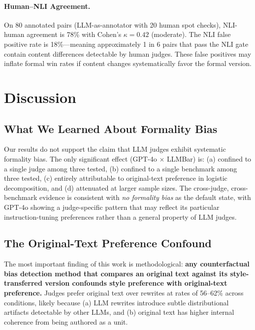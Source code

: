 \documentclass[11pt,a4paper]{article}
\begin{document}
\paragraph{Human--NLI Agreement.} On 80 annotated pairs (LLM-as-annotator with 20 human spot checks), NLI-human agreement is 78\% with Cohen's $\kappa = 0.42$ (moderate). The NLI false positive rate is 18\%---meaning approximately 1 in 6 pairs that pass the NLI gate contain content differences detectable by human judges. These false positives may inflate formal win rates if content changes systematically favor the formal version.

\section{Discussion}

\subsection{What We Learned About Formality Bias}

Our results do not support the claim that LLM judges exhibit systematic formality bias. The only significant effect (GPT-4o $\times$ LLMBar) is: (a) confined to a single judge among three tested, (b) confined to a single benchmark among three tested, (c) entirely attributable to original-text preference in logistic decomposition, and (d) attenuated at larger sample sizes. The cross-judge, cross-benchmark evidence is consistent with \emph{no formality bias} as the default state, with GPT-4o showing a judge-specific pattern that may reflect its particular instruction-tuning preferences rather than a general property of LLM judges.

\subsection{The Original-Text Preference Confound}

The most important finding of this work is methodological: \textbf{any counterfactual bias detection method that compares an original text against its style-transferred version confounds style preference with original-text preference.} Judges prefer original text over rewrites at rates of 56--62\% across conditions, likely because (a) LLM rewrites introduce subtle distributional artifacts detectable by other LLMs, and (b) original text has higher internal coherence from being authored as a unit.
\end{document}
